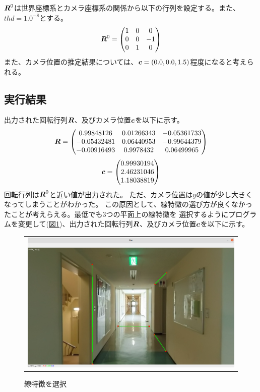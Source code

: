 \documentclass[]{jarticle}          %
\begin{document}
$\mbox{\boldmath $R$}^0$は世界座標系とカメラ座標系の関係から以下の行列を設定する。また、$thd=1.0^{-8}$とする。
\begin{equation}
  \mbox{\boldmath $R$}^0 = 
  \begin{pmatrix}
    1 & 0 & 0 \\
    0 & 0 & -1 \\
    0 & 1 & 0 \\
  \end{pmatrix}
\end{equation}
また、カメラ位置の推定結果については、$\mbox{\boldmath $c$}=(0.0, 0.0, 1.5)$程度になると考えられる。
\subsection{実行結果}
出力された回転行列$\mbox{\boldmath $R$}$、及びカメラ位置$\mbox{\boldmath $c$}$を以下に示す。
\begin{equation}
  \mbox{\boldmath $R$} =
  \begin{pmatrix}
    0.99848126 & 0.01266343 & -0.05361733 \\
    -0.05432481 &  0.06440953 & -0.99644379 \\
    -0.00916493 & 0.9978432 & 0.06499965 \\
  \end{pmatrix}
\end{equation}
\begin{equation}
  \mbox{\boldmath $c$} =
  \begin{pmatrix}
    0.99930194 \\
    2.46231046 \\
    1.18038819 \\
  \end{pmatrix}
\end{equation}
回転行列は$\mbox{\boldmath $R$}^0$と近い値が出力された。
ただ、カメラ位置は$y$の値が少し大きくなってしまうことがわかった。
この原因として、線特徴の選び方が良くなかったことが考えらえる。最低でも3つの平面上の線特徴を
選択するようにプログラムを変更して(\hyperref[five]{図\ref{five}})、出力された回転行列$\mbox{\boldmath $R$}$、及びカメラ位置$\mbox{\boldmath $c$}$を以下に示す。
\begin{figure}[!ht]
  \begin{center}
    \begin{tabular}{c}
      \includegraphics[keepaspectratio, scale=0.3]{figures/select_line.png}
    \end{tabular}
  \end{center}
  \caption{線特徴を選択}
  \label{five}
\end{figure}
\end{document}
